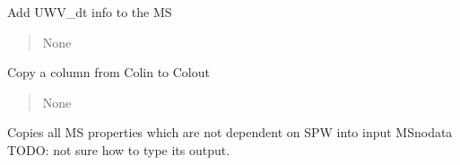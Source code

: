 \documentclass[letterpaper,10pt,english]{sphinxmanual}
\begin{document}
\begin{fulllineitems}
\begin{fulllineitems}
\begin{quote}
\begin{description}
\end{description}\end{quote}

\end{fulllineitems}


\begin{fulllineitems}
\label{\detokenize{api/killMS.Data:killMS.Data.ClassMS.ClassMS.AddUVW_dt}}
\pysigstartsignatures
{}
\pysigstopsignatures
\sphinxAtStartPar
Add UWV\_dt info to the MS
\begin{quote}\begin{description}
\sphinxAtStartPar
None

\end{description}\end{quote}

\end{fulllineitems}


\begin{fulllineitems}
\label{\detokenize{api/killMS.Data:killMS.Data.ClassMS.ClassMS.CopyCol}}
\pysigstartsignatures
{}
\pysigstopsignatures
\sphinxAtStartPar
Copy a column from Colin to Colout
\begin{quote}\begin{description}
\sphinxAtStartPar
None

\end{description}\end{quote}

\end{fulllineitems}


\begin{fulllineitems}
\label{\detokenize{api/killMS.Data:killMS.Data.ClassMS.ClassMS.CopyNonSPWDependent}}
\pysigstartsignatures
{}
\pysigstopsignatures
\sphinxAtStartPar
Copies all MS properties which are not dependent on SPW into input MSnodata
TODO: not sure how to type its output.


\end{fulllineitems}
\end{fulllineitems}
\end{document}
